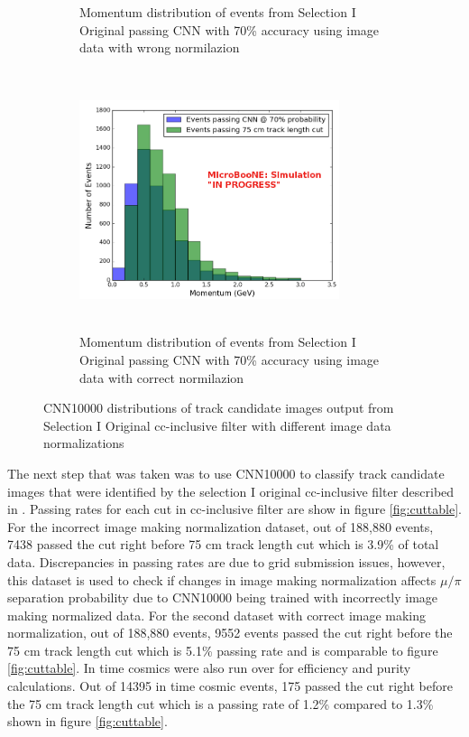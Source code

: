 \begin{figure}[htp!]
\begin{subfigure}[b]{.45\textwidth}
	\caption{Momentum distribution of events from Selection I Original passing CNN with 70\% accuracy using image data with wrong normilazion}
	\label{fig:momentum_wrongnorm}
	\end{subfigure}
	\quad
	\begin{subfigure}[b]{.45\textwidth}
	\includegraphics[width=3in,height=3in]{figs/sel1_parP_rightnorm_acc70_0706.png}
	\caption{Momentum distribution of events from Selection I Original passing CNN with 70\% accuracy using image data with correct normilazion}
	\label{fig:momentum_rightnorm}
	\end{subfigure}
	\quad
\caption{CNN10000 distributions of track candidate images output from Selection I Original cc-inclusive filter with different image data normalizations}
\label{fig:CNN_dist}
\end{figure}

The next step that was taken was to use CNN10000 to classify track candidate images that were identified by the selection I original cc-inclusive filter described in \cite{cc-inclusive}. Passing rates for each cut in cc-inclusive filter are show in figure \ref{fig:cuttable}. For the incorrect image making normalization dataset, out of 188,880 events, 7438 passed the cut right before 75 cm track length cut which is 3.9\% of total data. Discrepancies in passing rates are due to grid submission issues, however, this dataset is used to check if changes in image making normalization affects $\mu/\pi$ separation probability due to CNN10000 being trained with incorrectly image making normalized data. For the second dataset with correct image making normalization, out of 188,880 events, 9552 events passed the cut right before the 75 cm track length cut which is 5.1\% passing rate and is comparable to figure \ref{fig:cuttable}. In time cosmics were also run over for efficiency and purity calculations. Out of 14395 in time cosmic events, 175 passed the cut right before the 75 cm track length cut which is a passing rate of 1.2\% compared to 1.3\% shown in figure \ref{fig:cuttable}. 

